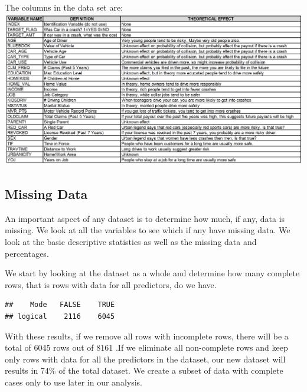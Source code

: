 \documentclass[]{article}
\begin{document}
The columns in the data set are:\\
\includegraphics{dataTable.png}

\subsection{Missing Data}\label{missing-data}

An important aspect of any dataset is to determine how much, if any,
data is missing. We look at all the variables to see which if any have
missing data. We look at the basic descriptive statistics as well as the
missing data and percentages.

We start by looking at the dataset as a whole and determine how many
complete rows, that is rows with data for all predictors, do we have.

\begin{verbatim}
##    Mode   FALSE    TRUE 
## logical    2116    6045
\end{verbatim}

With these results, if we remove all rows with incomplete rows, there
will be a total of 6045 rows out of 8161 .If we eliminate all
non-complete rows and keep only rows with data for all the predictors in
the dataset, our new dataset will results in 74\% of the total dataset.
We create a subset of data with complete cases only to use later in our
analysis.
\end{document}
